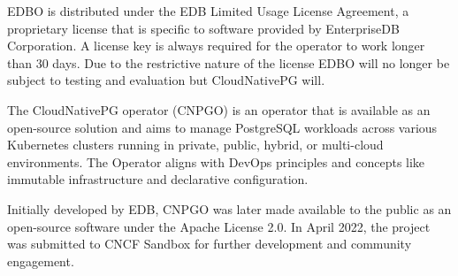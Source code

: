 EDBO is distributed under the EDB Limited Usage License Agreement, a proprietary license that is specific to software provided by EnterpriseDB Corporation. A license key is always required for the operator to work longer than 30 days. \cite{EDBdocuLicence} Due to the restrictive nature of the license EDBO will no longer be subject to testing and evaluation but CloudNativePG will.

\pagebreak

The CloudNativePG operator (CNPGO) is an operator that is available as an open-source solution and aims to manage PostgreSQL workloads across various Kubernetes clusters running in private, public, hybrid, or multi-cloud environments. The Operator aligns with DevOps principles and concepts like immutable infrastructure and declarative configuration. \cite{CNPGdocu}

Initially developed by EDB, CNPGO was later made available to the public as an open-source software under the Apache License 2.0. In April 2022, the project was submitted to CNCF Sandbox for further development and community engagement. \cite{CNPGdocu}

